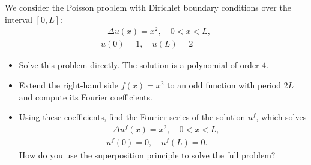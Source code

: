 \documentclass[11pt]{article}
\begin{document}
\begin{exercise}
    We consider the Poisson problem with Dirichlet boundary conditions over the interval $[0,L]$:
    \begin{gather*}
        - \Delta u(x) = x^2, \quad 0 < x < L,
        \\
        u(0) = 1, \quad u(L) = 2
    \end{gather*}
    \begin{itemize}
        \item Solve this problem directly. The solution is a polynomial of order $4$.
        \item Extend the right-hand side $f(x) = x^2$ to an odd function with period $2L$ and compute its Fourier coefficients.
        \item 
        Using these coefficients, find the Fourier series of the solution $u^f$,
        which solves 
        \begin{gather*}
            - \Delta u^f(x) = x^2, \quad 0 < x < L,
            \\
            u^f(0) = 0, \quad u^f(L) = 0.
        \end{gather*}
        How do you use the superposition principle to solve the full problem? 
    \end{itemize}
\end{exercise}
\end{document}
